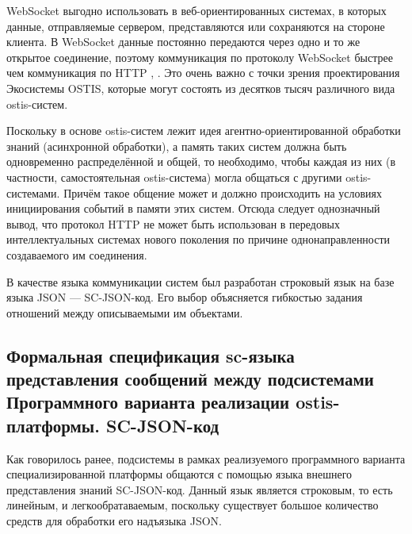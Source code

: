 \begin{textitemize}
    \item WebSocket выгодно использовать в веб-ориентированных системах, в которых данные, отправляемые сервером, представляются или сохраняются на стороне клиента. В WebSocket данные постоянно передаются через одно и то же открытое соединение, поэтому коммуникация по протоколу WebSocket быстрее чем коммуникация по HTTP , . Это очень важно с точки зрения проектирования Экосистемы OSTIS, которые могут состоять из десятков тысяч различного вида ostis-систем.
    \item Поскольку в основе ostis-систем лежит идея агентно-ориентированной обработки знаний (асинхронной обработки), а память таких систем должна быть одновременно распределённой и общей, то необходимо, чтобы каждая из них (в частности, самостоятельная ostis-система) могла общаться с другими ostis-системами. Причём такое общение может и должно происходить на условиях инициирования событий в памяти этих систем. Отсюда следует однозначный вывод, что протокол HTTP не может быть использован в передовых интеллектуальных системах нового поколения по причине однонаправленности создаваемого им соединения.
\end{textitemize}
В качестве языка коммуникации систем был разработан строковый язык на базе языка JSON  --- SC-JSON-код. Его выбор объясняется гибкостью задания отношений между описываемыми им объектами.

\subsection{Формальная спецификация sc-языка представления сообщений между подсистемами Программного варианта реализации ostis-платформы. SC-JSON-код}
\label{sec_soft_platform_sc_json_code}

Как говорилось ранее, подсистемы в рамках реализуемого программного варианта специализированной платформы общаются с помощью языка внешнего представления знаний SC-JSON-код. Данный язык является строковым, то есть линейным, и легкообратаваемым, поскольку существует большое количество средств для обработки его надъязыка JSON.

\begin{SCn}
\begin{scnindent}
\end{scnindent}
\end{SCn}

